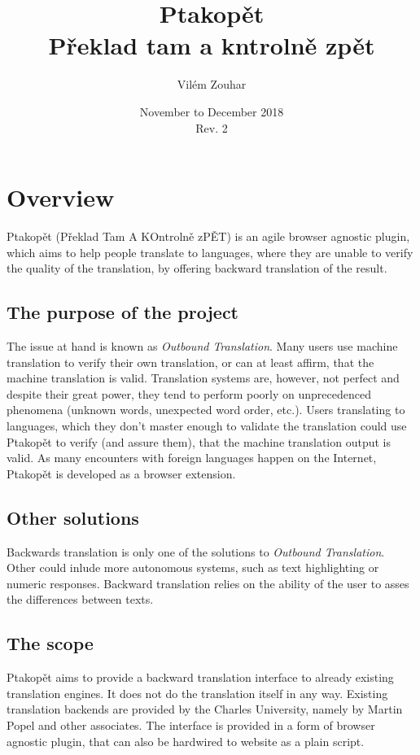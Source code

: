 \documentclass[a4paper]{article}
\begin{document}
\title{Ptakopět \\ \large Překlad tam a kntrolně zpět }
\author{Vilém Zouhar}
\date{November to December 2018 \\ Rev. 2}
\maketitle 


\section*{Overview}
Ptakopět (Překlad Tam A KOntrolně zPĚT) is an agile browser agnostic plugin, which aims to help people translate to languages, where they are unable to verify the quality of the translation, by offering backward translation of the result.

\subsection*{The purpose of the project}
The issue at hand is known as \textit{Outbound Translation}. Many users use machine translation to verify their own translation, or can at least affirm, that the machine translation is valid. Translation systems are, however, not perfect and despite their great power, they tend to perform poorly on unprecedenced phenomena (unknown words, unexpected word order, etc.). Users translating to languages, which they don't master enough to validate the translation could use Ptakopět to verify (and assure them), that the machine translation output is valid. As many encounters with foreign languages happen on the Internet, Ptakopět is developed as a browser extension.

\subsection*{Other solutions}
Backwards translation is only one of the solutions to \textit{Outbound Translation}. Other could inlude more autonomous systems, such as text highlighting or numeric responses. Backward translation relies on the ability of the user to asses the differences between texts.

\subsection*{The scope}
Ptakopět aims to provide a backward translation interface to already existing translation engines. It does not do the translation itself in any way. Existing translation backends are provided by the Charles University, namely by Martin Popel and other associates. The interface is provided in a form of browser agnostic plugin, that can also be hardwired to website as a plain script.
\end{document}

